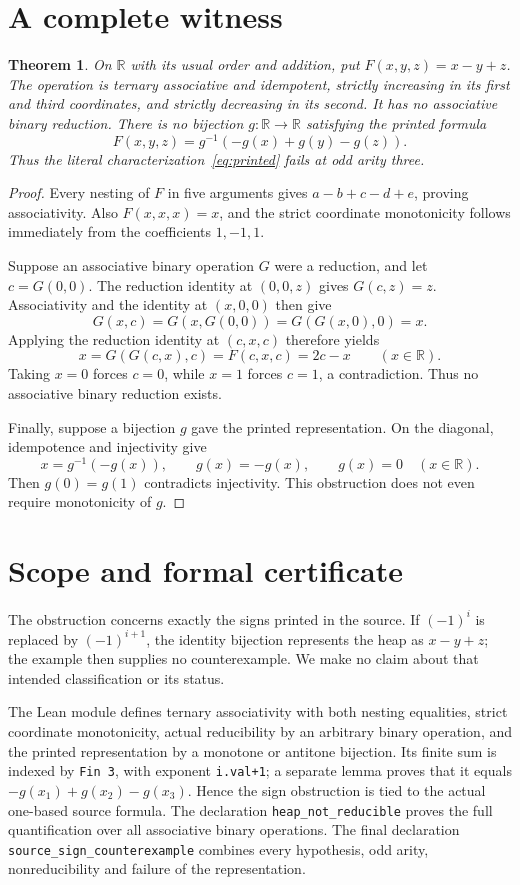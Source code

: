 \documentclass[11pt]{article}
\newtheorem{theorem}{Theorem}
\begin{document}
\section{A complete witness}
\begin{theorem}
On $\mathbb R$ with its usual order and addition, put $F(x,y,z)=x-y+z$.
The operation is ternary associative and idempotent, strictly increasing
in its first and third coordinates, and strictly decreasing in its second.
It has no associative binary reduction. There is no bijection
$g:\mathbb R\to\mathbb R$ satisfying the printed formula
\[
 F(x,y,z)=g^{-1}(-g(x)+g(y)-g(z)).
\]
Thus the literal characterization~\eqref{eq:printed} fails at odd arity three.
\end{theorem}
\begin{proof}
Every nesting of $F$ in five arguments gives $a-b+c-d+e$, proving
associativity. Also $F(x,x,x)=x$, and the strict coordinate monotonicity
follows immediately from the coefficients $1,-1,1$.

Suppose an associative binary operation $G$ were a reduction, and let
$c=G(0,0)$. The reduction identity at $(0,0,z)$ gives $G(c,z)=z$.
Associativity and the identity at $(x,0,0)$ then give
\[
 G(x,c)=G(x,G(0,0))=G(G(x,0),0)=x.
\]
Applying the reduction identity at $(c,x,c)$ therefore yields
\[
 x=G(G(c,x),c)=F(c,x,c)=2c-x\qquad(x\in\mathbb R).
\]
Taking $x=0$ forces $c=0$, while $x=1$ forces $c=1$, a contradiction.
Thus no associative binary reduction exists.

Finally, suppose a bijection $g$ gave the printed representation. On the
diagonal, idempotence and injectivity give
\[
 x=g^{-1}(-g(x)),\qquad g(x)=-g(x),\qquad g(x)=0
 \quad(x\in\mathbb R).
\]
Then $g(0)=g(1)$ contradicts injectivity. This obstruction does not even
require monotonicity of $g$.
\end{proof}

\section{Scope and formal certificate}
The obstruction concerns exactly the signs printed in the source. If
$(-1)^i$ is replaced by $(-1)^{i+1}$, the identity bijection represents the
heap as $x-y+z$; the example then supplies no counterexample. We make no
claim about that intended classification or its status.

The Lean module defines ternary associativity with both nesting equalities,
strict coordinate monotonicity, actual reducibility by an arbitrary binary
operation, and the printed representation by a monotone or antitone
bijection. Its finite sum is indexed by \texttt{Fin 3}, with exponent
\texttt{i.val+1}; a separate lemma proves that it equals
$-g(x_1)+g(x_2)-g(x_3)$. Hence the sign obstruction is tied to the actual
one-based source formula. The declaration \texttt{heap\_not\_reducible}
proves the full quantification over all associative binary operations.
The final declaration \texttt{source\_sign\_counterexample} combines every
hypothesis, odd arity, nonreducibility and failure of the representation.
\end{document}

